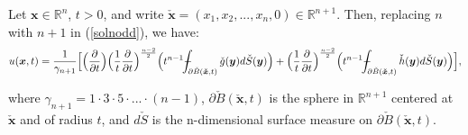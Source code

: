 \documentclass[a4paper, 12pt]{article}
\def\Xint#1{\mathchoice
{\XXint\displaystyle\textstyle{#1}}%
{\XXint\textstyle\scriptstyle{#1}}%
{\XXint\scriptstyle\scriptscriptstyle{#1}}%
{\XXint\scriptscriptstyle\scriptscriptstyle{#1}}%
\!\int}
\def\XXint#1#2#3{{\setbox0=\hbox{$#1{#2#3}{\int}$ }
\vcenter{\hbox{$#2#3$ }}\kern-.6\wd0}}
\def\dashint{\Xint-}
\numberwithin{equation}{section}
\begin{document}
Let $\boldsymbol{x} \in \mathbb{R}^n$, $t>0$, and write
$\check{\boldsymbol{x}}=(x_1, x_2, ..., x_n, 0) \in \mathbb{R}^{n+1}$. Then,
replacing $n$ with $n+1$ in (\ref{solnodd}), we have:
\begin{equation} \label{solneven}
        u(\boldsymbol{x}, t)=\frac{1}{\gamma_{n+1}}\Big[\Big(\diffp[1]{}{t}\Big)  \Big(\frac{1}{t} \diffp[1]{}{t} \Big)^{\frac{n-2}{2}}\Big(t^{n-1} \dashint_{\partial \check{B}(\boldsymbol{\check{x}},t)}\check{g}(\boldsymbol{y})d\check{S}(\boldsymbol{y}) \Big)
        + \Big(\frac{1}{t} \diffp[1]{}{t} \Big)^{\frac{n-2}{2}}\Big(t^{n-1} \dashint_{\partial \check{B}(\boldsymbol{\check{x}},t)}\check{h}(\boldsymbol{y})d\check{S}(\boldsymbol{y}) \Big)\Big],
\end{equation} 

 where $\gamma_{n+1}=1 \cdot 3 \cdot 5 \cdot ... \cdot (n-1)$, $\partial
 \check{B}(\boldsymbol{\check{x}},t)$ is the sphere in $\mathbb{R}^{n+1}$
 centered at $\boldsymbol{\check{x}}$ and of radius $t$, and $d\check{S}$ is the
 n-dimensional surface measure on $\partial
 \check{B}(\boldsymbol{\check{x}},t)$. \\
 
\end{document}
